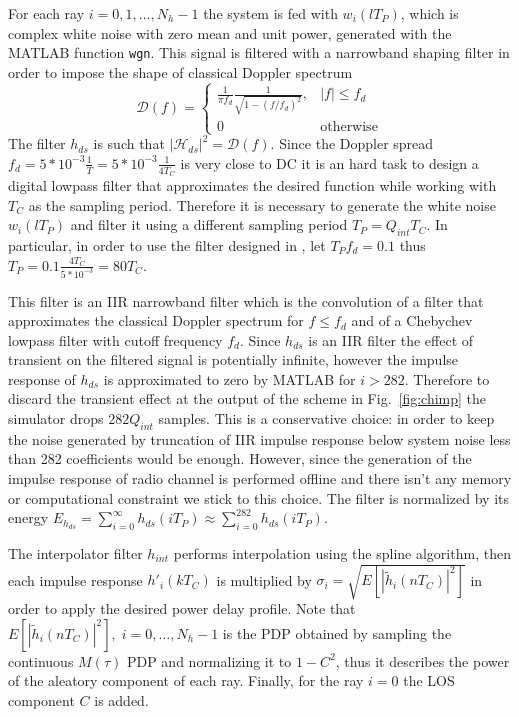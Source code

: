 \documentclass[10pt]{article}
\begin{document}
For each ray $i = 0, 1, \dots, N_h -1$ the system is fed with $w_i(lT_P)$, which is complex white noise with zero mean and unit power, generated with the MATLAB function \texttt{wgn}. This signal is filtered with a narrowband shaping filter in order to impose the shape of classical Doppler spectrum
\begin{equation}
  \mathcal{D}(f) =  \begin{cases} \frac{1}{\pi f_d} \frac{1}{\sqrt{1-(f/f_d)^2}}, & |f| \le f_d \\
                                  0                                              & \mbox{otherwise}
                   \end{cases}
\end{equation}
The filter $h_{ds}$ is such that $|\mathcal{H}_{ds}|^2 = \mathcal{D}(f)$. Since the Doppler spread $f_d = 5*10^{-3}\frac{1}{T} = 5*10^{-3}\frac{1}{4T_C}$ is very close to DC it is an hard task to design a digital lowpass filter that approximates the desired function while working with $T_C$ as the sampling period. Therefore it is necessary to generate the white noise $w_i(lT_P)$ and filter it using a different sampling period $T_P = Q_{int}T_C$. In particular, in order to use the filter designed in \cite{anachugg}, let $T_P f_d = 0.1$ thus $T_P = 0.1 \frac{4 T_C}{5*10^{-3}} = 80 T_C$.

This filter is an IIR narrowband filter which is the convolution of a filter that approximates the classical Doppler spectrum for $f \le f_d$ and of a Chebychev lowpass filter with cutoff frequency $f_d$. Since $h_{ds}$ is an IIR filter the effect of transient on the filtered signal is potentially infinite, however the impulse response of $h_{ds}$ is approximated to zero by MATLAB for $i > 282$. Therefore to discard the transient effect at the output of the scheme in Fig.~\ref{fig:chimp} the simulator drops $282Q_{int}$ samples. This is a conservative choice: in order to keep the noise generated by truncation of IIR impulse response below system noise less than 282 coefficients would be enough. However, since the generation of the impulse response of radio channel is performed offline and there isn't any memory or computational constraint we stick to this choice. The filter is normalized by its energy $E_{h_{ds}} = \sum_{i = 0}^{\infty} h_{ds} (iT_P) \approx \sum_{i = 0}^{282} h_{ds} (iT_P)$.

The interpolator filter $h_{int}$ performs interpolation using the spline algorithm, then each impulse response $h'_i(kT_C)$ is multiplied by $\sigma_i = \sqrt{E[|\tilde{h}_i(nT_C)|^2]}$ in order to apply the desired power delay profile. Note that $E[|\tilde{h}_i(nT_C)|^2], \; i=0,\dots,N_h -1$ is the PDP obtained by sampling the continuous $M(\tau)$ PDP and normalizing it to $1-C^2$, thus it describes the power of the aleatory component of each ray. Finally, for the ray $i = 0$ the LOS component $C$ is added.
\end{document}
